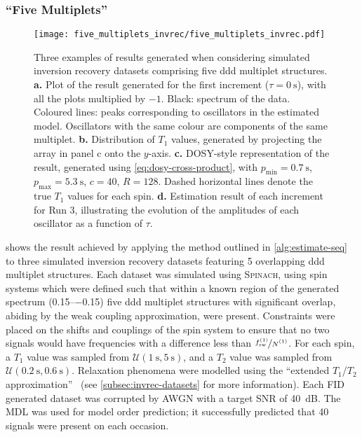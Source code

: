 \subsubsection{``Five Multiplets''}
\begin{figure}
    \vspace{-10pt}
    \texttt{[image: five\_multiplets\_invrec/five\_multiplets\_invrec.pdf]}
    \caption[
        Three examples of results generated when considering simulated
        inversion recovery datasets comprising five ddd multiplet structures.
    ]
    {
        Three examples of results generated when considering
        simulated inversion recovery datasets comprising five ddd multiplet
        structures.
        \textbf{a.} Plot of the result generated for the first increment ($\tau
        = \qty{0}{\second}$), with all the plots multiplied by $-1$. Black:
        spectrum of the data. Coloured lines: peaks corresponding to
        oscillators in the estimated model. Oscillators with the same colour
        are components of the same multiplet.
        \textbf{b.} Distribution of $T_1$ values, generated
        by projecting the array in panel c onto the $y$-axis.
        \textbf{c.} \ac{DOSY}-style representation of the result, generated using
        \cref{eq:dosy-cross-product},
        with
        $p_{\text{min}} = \qty{0.7}{\second}$,
        $p_{\text{max}} = \qty{5.3}{\second}$,
        $c = 40$,
        $R=128$.
        Dashed horizontal lines denote the true $T_1$ values for each spin.
        \textbf{d.} Estimation result of each increment for Run 3,
        illustrating the evolution of the amplitudes of each oscillator as a
        function of $\tau$.
    }
    \label{fig:five-multiplets-invrec}
\end{figure}
 shows the result achieved by applying the
method outlined in \cref{alg:estimate-seq}
to three simulated inversion recovery datasets featuring 5 overlapping ddd
multiplet structures.
Each dataset was simulated using \textsc{Spinach}, using spin systems which
were defined such that within a
known region of the generated spectrum
(\SIrange{0.15}{-0.15}{\partspermillion}) five ddd
multiplet structures with significant overlap, abiding by the weak coupling
approximation, were present.
Constraints were placed on the shifts and
couplings of the spin system to ensure that no two signals would have
frequencies with a difference less than $\nicefrac{\fswone}{\None}$.
For each spin, a $T_1$ value was sampled from $\mathcal{U}(\qty{1}{\second},
\qty{5}{\second})$, and a $T_2$ value was sampled from
$\mathcal{U}(\qty{0.2}{\second}, \qty{0.6}{\second})$.
Relaxation phenomena were modelled using the ``extended $T_1$/$T_2$
approximation''~\cite{SpinachRelax} (see \cref{subsec:invrec-datasets} for more
information).
Each \ac{FID} generated dataset was corrupted by \ac{AWGN} with a target
\ac{SNR} of \qty{40}{\deci\bel}. The \ac{MDL} was used for model order
prediction; it successfully predicted that 40 signals were present on each
occasion.

